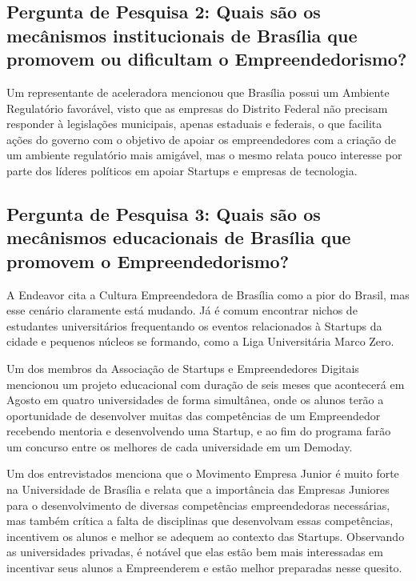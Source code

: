 \subsection{Pergunta de Pesquisa 2: Quais são os mecânismos institucionais de Brasília que promovem ou dificultam o Empreendedorismo?}
\label{subsection:pergunta_de_pesquisa_2}

Um representante de aceleradora mencionou que Brasília possui um Ambiente Regulatório favorável, visto que as empresas do Distrito Federal não precisam responder à legislações municipais, apenas estaduais e federais, o que facilita ações do governo com o objetivo de apoiar os empreendedores com a criação de um ambiente regulatório mais amigável, mas o mesmo relata pouco interesse por parte dos líderes políticos em apoiar Startups e empresas de tecnologia.
  
\subsection{Pergunta de Pesquisa 3: Quais são os mecânismos educacionais de Brasília que promovem o Empreendedorismo?}
\label{subsection:pergunta_de_pesquisa_3}

A Endeavor cita a Cultura Empreendedora de Brasília como a pior do Brasil, mas esse cenário claramente está mudando. Já é comum encontrar nichos de estudantes universitários frequentando os eventos relacionados à Startups da cidade e pequenos núcleos se formando, como a Liga Universitária Marco Zero. 

Um dos membros da Associação de Startups e Empreendedores Digitais mencionou um projeto educacional com duração de seis meses que acontecerá em Agosto em quatro universidades de forma simultânea, onde os alunos terão a oportunidade de desenvolver muitas das competências de um Empreendedor recebendo mentoria e desenvolvendo uma Startup, e ao fim do programa farão um concurso entre os melhores de cada universidade em um Demoday.

Um dos entrevistados menciona que o Movimento Empresa Junior é muito forte na Universidade de Brasília e relata que a importância das Empresas Juniores para o desenvolvimento de diversas competências empreendedoras necessárias, mas também crítica a falta de disciplinas que desenvolvam essas competências, incentivem os alunos e melhor se adequem ao contexto das Startups. Observando as universidades privadas, é notável que elas estão bem mais interessadas em incentivar seus alunos a Empreenderem e estão melhor preparadas nesse quesito.

